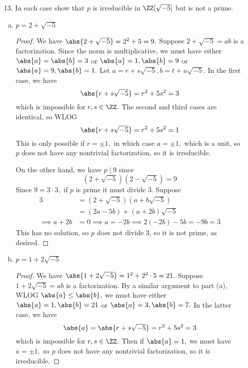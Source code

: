 \documentclass{article}
\begin{document}
\begin{itemize}
\begin{proof}
			If $n=p,$ then $a^2+b^2=1$ so either $a=\pm 1, b=0$ or $a=0, b=\pm 1.$ In either case, one of the two factors must be a unit. Thus, $p$ is irreducible in $\ZZ[i],$ as desired.
		\end{proof}

	\item[13.] In each case show that $p$ is irreducible in $\ZZ[\sqrt{-5}]$ but is not a prime.

		\begin{enumerate}[(a)]
			\item $p=2+\sqrt{-5}$
				\begin{proof}
					We have $\abs{2+\sqrt{-5}}=2^2+5=9.$ Suppose $2+\sqrt{-5}=ab$ is a factorization. Since the norm is multiplicative, we must have either $\abs{a}=\abs{b}=3$ or $\abs{a}=1, \abs{b}=9$ or $\abs{a}=9, \abs{b}=1.$ Let $a=r+s\sqrt{-5}, b=t+u\sqrt{-5}.$ In the first case, we have
					\[\abs{r+s\sqrt{-5}} = r^2+5s^2=3\]
					which is impossible for $r, s\in\ZZ.$ The second and third cases are identical, so WLOG
					\[\abs{r+s\sqrt{-5}} = r^2+5s^2=1\]
					This is only possible if $r=\pm 1,$ in which case $a=\pm 1,$ which is a unit, so $p$ does not have any nontrivial factorization, so it is irreducible. 

					On the other hand, we have $p\mid 9$ since
					\[\left( 2+\sqrt{-5} \right)\left( 2-\sqrt{-5} \right) = 9\]
					Since $9=3\cdot 3,$ if $p$ is prime it must divide 3. Suppose
					\begin{align*}
						3 &= \left( 2+\sqrt{-5} \right)\left( a+b\sqrt{-5} \right) \\
						&= (2a-5b) + (a+2b)\sqrt{-5} \\
						\implies a+2b&=0\implies a=-2b\implies 2(-2b)-5b=-9b=3
					\end{align*}
					This has no solution, so $p$ does not divide 3, so it is not prime, as desired.
				\end{proof}

			\item $p=1+2\sqrt{-5}$
				\begin{proof}
					We have $\abs{1+2\sqrt{-5}}=1^2+2^2\cdot 5 = 21.$ Suppose $1+2\sqrt{-5}=ab$ is a factorization. By a similar argument to part (a), WLOG $\abs{a}\le\abs{b},$ we must have either $\abs{a}=1, \abs{b}=21$ or $\abs{a}=3, \abs{b}=7.$ In the latter case, we have
					\[\abs{a}=\abs{r+s\sqrt{-5}}=r^2+5s^2=3\]
					which is impossible for $r, s\in\ZZ.$ Then if $\abs{a}=1,$ we must have $a=\pm 1,$ so $p$ does not have any nontrivial factorization, so it is irreducible.


\end{proof}
\end{enumerate}
\end{itemize}
\end{document}
